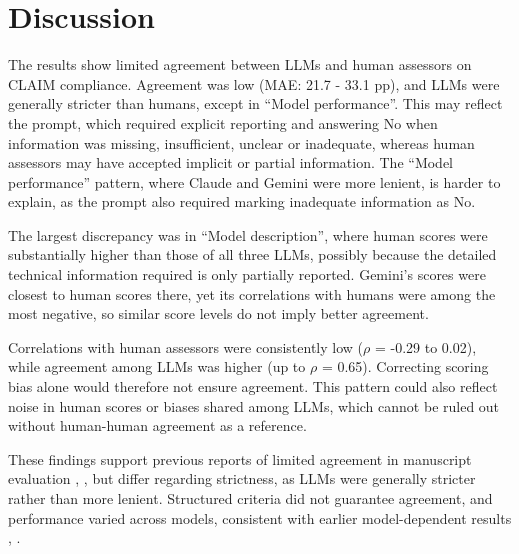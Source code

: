 \section{Discussion}
The results show limited agreement between LLMs and human assessors on CLAIM compliance. Agreement was low (MAE: 21.7 - 33.1 pp), and LLMs were generally stricter than humans, except in “Model performance”. This may reflect the prompt, which required explicit reporting and answering No when information was missing, insufficient, unclear or inadequate, whereas human assessors may have accepted implicit or partial information. The “Model performance” pattern, where Claude and Gemini were more lenient, is harder to explain, as the prompt also required marking inadequate information as No.

The largest discrepancy was in “Model description”, where human scores were substantially higher than those of all three LLMs, possibly because the detailed technical information required is only partially reported. Gemini’s scores were closest to human scores there, yet its correlations with humans were among the most negative, so similar score levels do not imply better agreement.

Correlations with human assessors were consistently low ($\rho$ = -0.29 to 0.02), while agreement among LLMs was higher (up to $\rho$ = 0.65). Correcting scoring bias alone would therefore not ensure agreement. This pattern could also reflect noise in human scores or biases shared among LLMs, which cannot be ruled out without human-human agreement as a reference. 

These findings support previous reports of limited agreement in manuscript evaluation \cite{saad-2024}, \cite{suleiman-2024}, but differ regarding strictness, as LLMs were generally stricter rather than more lenient. Structured criteria did not guarantee agreement, and performance varied across models, consistent with earlier model-dependent results \cite{pluimer-2026}, \cite{tsybulnik-2026}. 
